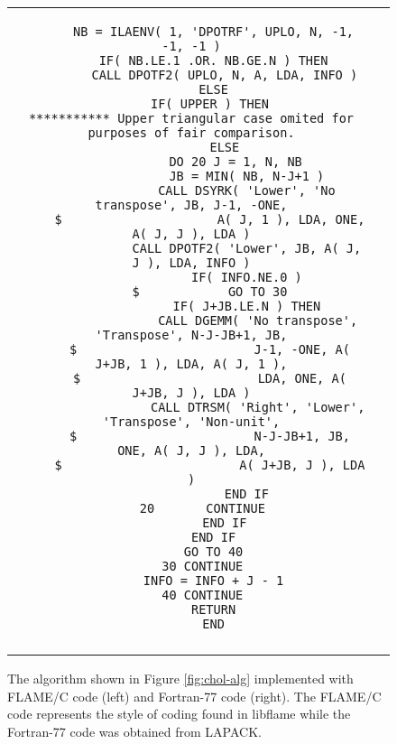\begin{figure}[tbp]
\begin{center}
\begin{tabular}{|c|c|}
\begin{minipage}[t]{3in}
{\begin{verbatim}
      NB = ILAENV( 1, 'DPOTRF', UPLO, N, -1, -1, -1 )
      IF( NB.LE.1 .OR. NB.GE.N ) THEN
         CALL DPOTF2( UPLO, N, A, LDA, INFO )
      ELSE
         IF( UPPER ) THEN    
*********** Upper triangular case omited for purposes of fair comparison.
         ELSE
            DO 20 J = 1, N, NB
               JB = MIN( NB, N-J+1 )
               CALL DSYRK( 'Lower', 'No transpose', JB, J-1, -ONE,
     $                     A( J, 1 ), LDA, ONE, A( J, J ), LDA )
               CALL DPOTF2( 'Lower', JB, A( J, J ), LDA, INFO )
               IF( INFO.NE.0 )
     $            GO TO 30
               IF( J+JB.LE.N ) THEN
                  CALL DGEMM( 'No transpose', 'Transpose', N-J-JB+1, JB,
     $                        J-1, -ONE, A( J+JB, 1 ), LDA, A( J, 1 ),
     $                        LDA, ONE, A( J+JB, J ), LDA )
                  CALL DTRSM( 'Right', 'Lower', 'Transpose', 'Non-unit',
     $                        N-J-JB+1, JB, ONE, A( J, J ), LDA,
     $                        A( J+JB, J ), LDA )
               END IF
   20       CONTINUE
         END IF
      END IF
      GO TO 40
   30 CONTINUE
      INFO = INFO + J - 1
   40 CONTINUE
      RETURN
      END
\end{verbatim}
}
\end{minipage}
\\
 & \\ \hline
\end{tabular}
\end{center}
\caption{
The algorithm shown in Figure \ref{fig:chol-alg} implemented with
FLAME/C code (left) and Fortran-77 code (right).
The FLAME/C code represents the style of coding found in libflame
while the Fortran-77 code was obtained from LAPACK.
}
\label{fig:flame-lapack-code}
\end{figure}
